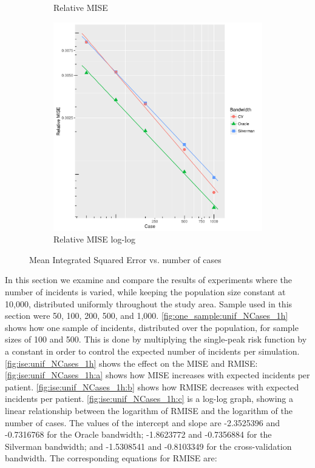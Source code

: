 \begin{figure}[htbp]
\begin{subfigure}[b]{0.3\textwidth}
    \caption{Relative MISE}
    \label{fig:ise:unif_NCases_1h:b}
    \end{subfigure}
    \begin{subfigure}[b]{0.3\textwidth}
    \includegraphics[width=\textwidth]{results/by_num_cases/RMISE-vs-cases-log-log}
    \caption{Relative MISE log-log}
    \label{fig:ise:unif_NCases_1h:c}
    \end{subfigure}
    \caption[MISE: by number of cases]{Mean Integrated Squared Error vs. number of cases}
    \label{fig:ise:unif_NCases_1h}
\end{figure}

In this section we examine and compare the results of experiments where the number of incidents is varied, while keeping the population size constant at 10,000, distributed uniformly throughout the study area.
Sample used in this section were 50, 100, 200, 500, and 1,000.
\autoref{fig:one_sample:unif_NCases_1h} shows how one sample of incidents, distributed over the population, for sample sizes of 100 and 500.
This is done by multiplying the single-peak risk function by a constant in order to control the expected number of incidents per simulation.
\autoref{fig:ise:unif_NCases_1h} shows the effect on the MISE and RMISE:
\autoref{fig:ise:unif_NCases_1h:a} shows how MISE increases with expected incidents per patient.
\autoref{fig:ise:unif_NCases_1h:b} shows how RMISE decreases with expected incidents per patient.
\autoref{fig:ise:unif_NCases_1h:c} is a log-log graph, showing a linear relationship between the logarithm of RMISE and the logarithm of the number of cases.
The values of the intercept and slope are -2.3525396 and -0.7316768 for the Oracle bandwidth; -1.8623772 and -0.7356884 for the Silverman bandwidth; and -1.5308541 and -0.8103349 for the cross-validation bandwidth.
The corresponding equations for RMISE are:

